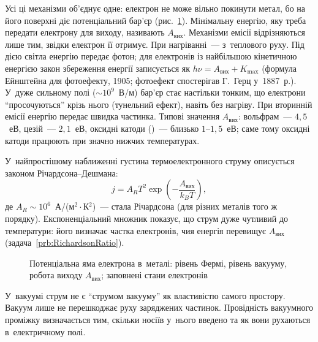 Усі ці механізми об'єднує одне: електрон не може вільно покинути метал, бо на його
поверхні діє потенціальний бар'єр (рис.~\ref{pic:WorkFunction}). Мінімальну енергію, яку
треба передати електрону для виходу, називають  $A_{\text{вих}}$.
Механізми емісії відрізняються лише тим, звідки електрон її отримує. При нагріванні~---
з~теплового руху. Під дією світла енергію передає фотон; для електронів із найбільшою кінетичною енергією
закон збереження енергії записується як $h\nu=A_{\text{вих}}+K_{\max}$ (формула
Ейнштейна для фотоефекту, 1905; фотоефект спостерігав Г.~Герц у~1887~р.). У~дуже сильному полі ($\sim10^9$~В/м) бар'єр стає настільки тонким, що
електрони \enquote{просочуються} крізь нього (тунельний ефект), навіть без нагріву. При
вторинній емісії енергію передає швидка частинка. Типові значення $A_{\text{вих}}$:
вольфрам~--- $4{,}5$~еВ, цезій~--- $2{,}1$~еВ, оксидні катоди ()~--- близько
$1$--$1{,}5$~еВ; саме тому оксидні катоди працюють при значно нижчих температурах.

У~найпростішому наближенні густина термоелектронного струму описується законом
Річардсона--Дешмана:
\begin{equation}\label{eq:RichardsonDushman}
	j = A_R T^2
	\exp\left(-\frac{A_{\text{вих}}}{k_BT}\right),
\end{equation}
де $A_R\sim10^{6}$~А/(м$^2\cdot$К$^2$)~--- стала Річардсона (для різних металів того ж
порядку). Експоненціальний множник показує, що струм дуже чутливий до температури: його
визначає частка електронів, чия енергія перевищує $A_{\text{вих}}$
(задача~\ref{prb:RichardsonRatio}).

\begin{figure}[h!]\centering
	\caption{Потенціальна яма електрона в~металі: рівень Фермі, рівень вакууму, робота
	виходу $A_{\text{вих}}$; заповнені стани електронів\label{pic:WorkFunction}}
\end{figure}

\begin{Attention}
	У~вакуумі струм не є \enquote{струмом вакууму} як властивістю самого простору. Вакуум
	лише не перешкоджає руху заряджених частинок. Провідність вакуумного проміжку
	визначається тим, скільки носіїв у~нього введено та як вони рухаються в~електричному
	полі.
\end{Attention}

